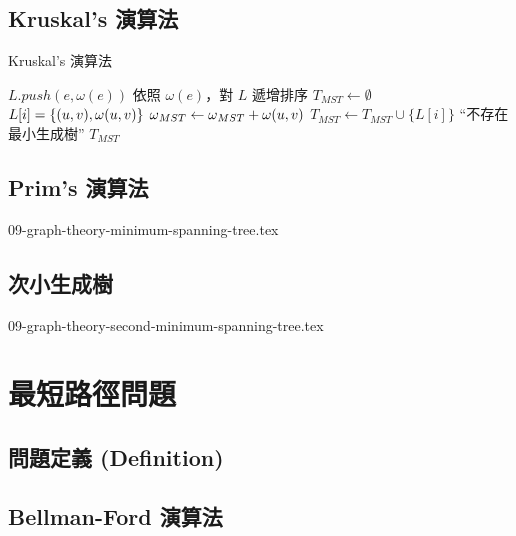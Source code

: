 \documentclass[12pt,a4paper,oneside]{report}
\begin{document}
\begin{CJK}{UTF8}{bkai}
\subsection{Kruskal's 演算法}
\begin{algorithm}
\caption{Kruskal's 演算法}
\label{algo:mst_kruskal}
\begin{algorithmic}[1]
    \State $L.push(e,\omega{(e)})$
  \EndFor
    \State {}
  \EndFor
  \State 依照 $\omega{(e)}$，對 $L$ 遞增排序
  \State $T_{MST}\gets{\emptyset}$
    \State $L[i]=\{{({u},{v}),\omega{\ensuremath{({u},{v})}}}\}$
      \State {}
      \State $\omega{}_{MST}\gets{\omega{}_{MST}+\omega{\ensuremath{({u},{v})}}}$
      \State $T_{MST}\gets{T_{MST}\cup{\{L[i]\}}}$
    \EndIf
  \EndFor
    \State \Return ``不存在最小生成樹''
  \EndIf
  \State \Return $T_{MST}$
\EndProcedure
\end{algorithmic}
\end{algorithm}

\subsection{Prim's 演算法}

{09-graph-theory-minimum-spanning-tree.tex}

\subsection{次小生成樹}

{09-graph-theory-second-minimum-spanning-tree.tex}

\section{最短路徑問題}
\subsection{問題定義 (Definition)}
\subsection{Bellman-Ford 演算法}


\end{CJK}
\end{document}
